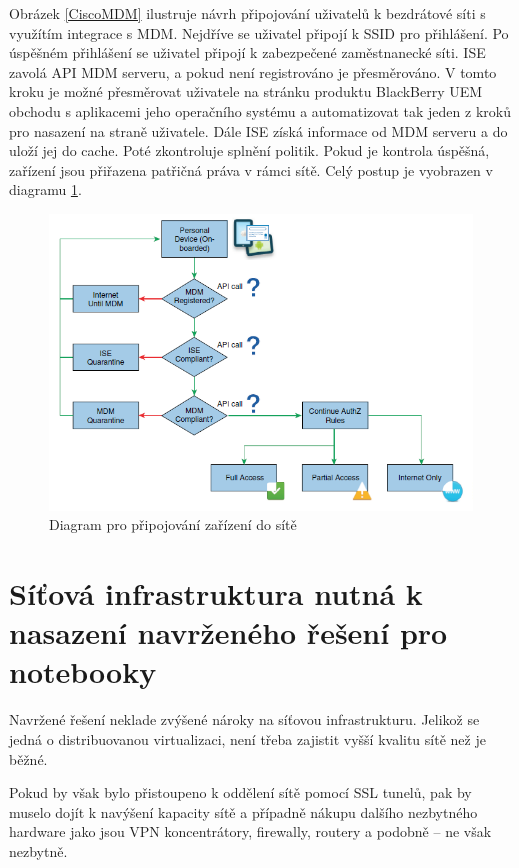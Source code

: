 Obrázek \ref{CiscoMDM} ilustruje návrh připojování uživatelů k bezdrátové síti s využítím integrace s MDM. Nejdříve se uživatel připojí k SSID pro přihlášení. Po úspěšném přihlášení se uživatel připojí k zabezpečené zaměstnanecké síti. ISE zavolá API MDM serveru, a pokud není registrováno je přesměrováno. V tomto kroku je možné přesměrovat uživatele na stránku produktu BlackBerry UEM obchodu s aplikacemi jeho operačního systému a automatizovat tak jeden z kroků pro nasazení na straně uživatele. Dále ISE získá informace od MDM serveru a do uloží jej do cache. Poté zkontroluje splnění politik. Pokud je kontrola úspěšná, zařízení jsou přiřazena patřičná práva v rámci sítě. Celý postup je vyobrazen v diagramu \ref{CiscoFlow}.


\begin{figure}[h!]
\centering
\includegraphics[width=13cm]{img/CiscoFlow}
\caption{Diagram pro připojování zařízení do sítě\label{CiscoFlow}}
\end{figure} 


\section{Síťová infrastruktura nutná k nasazení navrženého řešení pro notebooky}
Navržené řešení neklade zvýšené nároky na síťovou infrastrukturu. Jelikož se jedná o distribuovanou virtualizaci, není třeba zajistit vyšší kvalitu sítě než je běžné.

Pokud by však bylo přistoupeno k oddělení sítě pomocí SSL tunelů, pak by muselo dojít k navýšení kapacity sítě a případně nákupu dalšího nezbytného hardware jako jsou VPN koncentrátory, firewally, routery a podobně -- ne však nezbytně.

